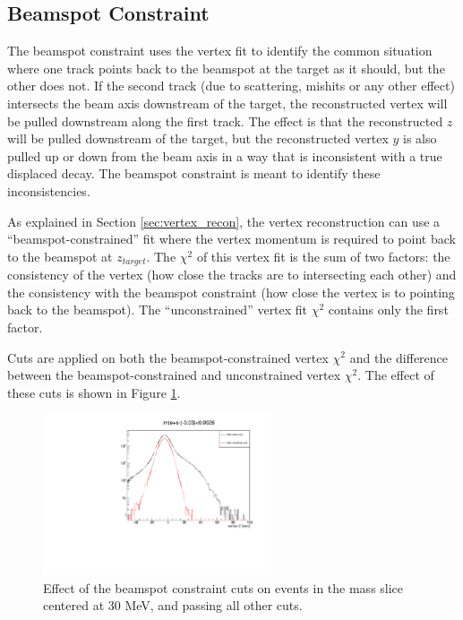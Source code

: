 \subsection{Beamspot Constraint}
The beamspot constraint uses the vertex fit to identify the common situation where one track points back to the beamspot at the target as it should, but the other does not.
If the second track (due to scattering, mishits or any other effect) intersects the beam axis downstream of the target, the reconstructed vertex will be pulled downstream along the first track.
The effect is that the reconstructed $z$ will be pulled downstream of the target, but the reconstructed vertex $y$ is also pulled up or down from the beam axis in a way that is inconsistent with a true displaced decay.
The beamspot constraint is meant to identify these inconsistencies.

As explained in Section \ref{sec:vertex_recon}, the vertex reconstruction can use a ``beamspot-constrained'' fit where the vertex momentum is required to point back to the beamspot at $z_{target}$.
The $\chi^2$ of this vertex fit is the sum of two factors: the consistency of the vertex (how close the tracks are to intersecting each other) and the consistency with the beamspot constraint (how close the vertex is to pointing back to the beamspot).
The ``unconstrained'' vertex fit $\chi^2$ contains only the first factor.

Cuts are applied on both the beamspot-constrained vertex $\chi^2$ and the difference between the beamspot-constrained and unconstrained vertex $\chi^2$.
The effect of these cuts is shown in Figure \ref{fig:bsc_performance}.

\begin{figure}[ht]
\begin{center}
    \includegraphics[width=0.6\textwidth,page=4,angle=-90]{vertexing/figs/vertcutplots}
\end{center}
    \caption{Effect of the beamspot constraint cuts on events in the mass slice centered at 30 MeV, and passing all other cuts.
    }
    \label{fig:bsc_performance}
\end{figure}

